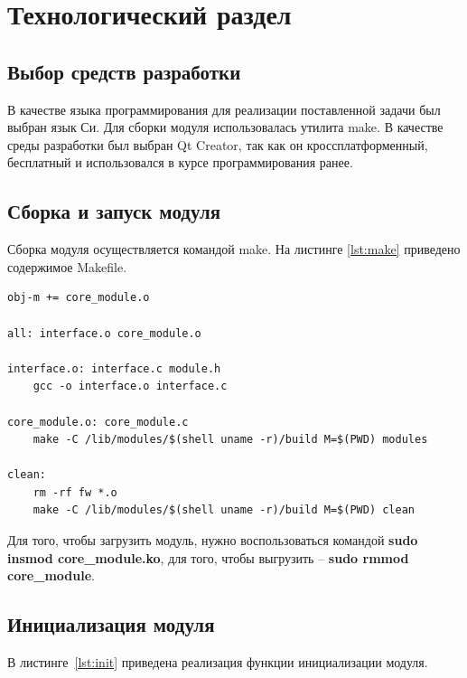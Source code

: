 \documentclass{bmstu}
\begin{document}

\chapter{Технологический раздел}

\section{Выбор средств разработки}
В качестве языка программирования для реализации поставленной задачи был выбран язык Си. Для сборки модуля использовалась утилита make. В качестве среды разработки был выбран Qt Creator\cite{qt}, так как он кроссплатформенный, бесплатный и использовался в курсе программирования ранее. 

\section{Сборка и запуск модуля}
Сборка модуля осуществляется командой make. На листинге \ref{lst:make} приведено содержимое Makefile.

\begin{lstlisting}[caption = {Makefile}, label=lst:make]
obj-m += core_module.o

all: interface.o core_module.o

interface.o: interface.c module.h
	gcc -o interface.o interface.c	

core_module.o: core_module.c
	make -C /lib/modules/$(shell uname -r)/build M=$(PWD) modules

clean:
	rm -rf fw *.o
	make -C /lib/modules/$(shell uname -r)/build M=$(PWD) clean
\end{lstlisting}

Для того, чтобы загрузить модуль, нужно воспользоваться командой \textbf{sudo insmod core\_module.ko}, для того, чтобы выгрузить -- \textbf{sudo rmmod core\_module}.

\section{Инициализация модуля}
В листинге~\ref{lst:init} приведена реализация функции инициализации модуля.
\end{document}
